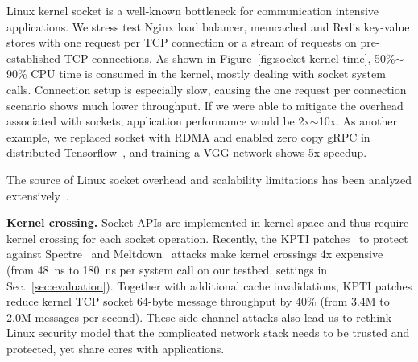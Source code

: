 Linux kernel socket is a well-known bottleneck for communication intensive applications. We stress test Nginx load balancer, memcached and Redis key-value stores with one request per TCP connection or a stream of requests on pre-established TCP connections. As shown in Figure~\ref{fig:socket-kernel-time}, 50\%$\sim$90\% CPU time is consumed in the kernel, mostly dealing with socket system calls. Connection setup is especially slow, causing the one request per connection scenario shows much lower throughput. If we were able to mitigate the overhead associated with sockets, application performance would be 2x$\sim$10x. As another example, we replaced socket with RDMA and enabled zero copy gRPC in distributed Tensorflow~\cite{abadi2016tensorflow}, and training a VGG network shows 5x speedup.







The source of Linux socket overhead and scalability limitations has been analyzed extensively~\cite{peter2016arrakis,lin2016scalable}.

\textbf{Kernel crossing.}
Socket APIs are implemented in kernel space and thus require kernel crossing for each socket operation. Recently, the KPTI patches~\cite{kpti} to protect against Spectre~\cite{Kocher2018spectre} and Meltdown~\cite{Lipp2018meltdown} attacks make kernel crossings 4x expensive (from 48~ns to 180~ns per system call on our testbed, settings in Sec.~\ref{sec:evaluation}). Together with additional cache invalidations, KPTI patches reduce kernel TCP socket 64-byte message throughput by 40\% (from 3.4M to 2.0M messages per second). These side-channel attacks also lead us to rethink Linux security model that the complicated network stack needs to be trusted and protected, yet share cores with applications.

